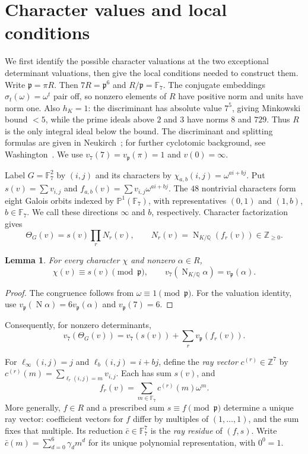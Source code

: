 \documentclass[11pt]{amsart}
\theoremstyle{plain}
\newtheorem{lemma}[theorem]{Lemma}
\theoremstyle{definition}
\numberwithin{equation}{section}
\DeclareMathOperator{\Nm}{N}
\newcommand{\Z}{\mathbb Z}
\newcommand{\Q}{\mathbb Q}
\newcommand{\F}{\mathbb F}
\newcommand{\GG}{G}
\newcommand{\pp}{\mathfrak p}
\begin{document}
\section{Character values and local conditions}\label{sec:prelim}

We first identify the possible character valuations at the two
exceptional determinant valuations, then give the local conditions
needed to construct them.
Write $\pp=\pi R$. Then $7R=\pp^6$ and $R/\pp=\F_7$.
The conjugate embeddings $\sigma_t(\omega)=\omega^t$ pair off, so
nonzero elements of $R$ have positive norm and units have norm one.
Also $h_K=1$: the discriminant has absolute value $7^5$, giving
Minkowski bound $<5$, while the prime ideals above $2$ and $3$ have
norms $8$ and $729$. Thus $R$ is the only integral ideal below the
bound. The discriminant and splitting formulas are given in
Neukirch~\cite[pp.~59--61]{Neukirch1999}; for further cyclotomic
background, see Washington~\cite[Chapter~2, pp.~9--19]{Washington1997}.
We use $v_7(7)=v_\pp(\pi)=1$ and $v(0)=\infty$.

Label $\GG=\F_7^2$ by $(i,j)$ and its characters by
$\chi_{a,b}(i,j)=\omega^{ai+bj}$. Put $s(v)=\sum v_{i,j}$ and
$f_{a,b}(v)=\sum v_{i,j}\omega^{ai+bj}$. The $48$ nontrivial
characters form eight Galois orbits indexed by $\mathbb P^1(\F_7)$,
with representatives $(0,1)$ and $(1,b)$, $b\in\F_7$. We call these
directions $\infty$ and $b$, respectively. Character factorization gives
\begin{equation}\label{eq:factorization}
 \Theta_\GG(v)=s(v)\prod_rN_r(v),\qquad
 N_r(v)=\Nm_{K/\Q}(f_r(v))\in\Z_{\ge0}.
\end{equation}

\begin{lemma}\label{lem:chi-mod-p}\label{lem:val-norm}
For every character $\chi$ and nonzero $\alpha\in R$,
\[
 \chi(v)\equiv s(v)\pmod\pp,\qquad
 v_7(\Nm_{K/\Q}\alpha)=v_\pp(\alpha).
\]
\end{lemma}
\begin{proof}
The congruence follows from $\omega\equiv1\pmod\pp$.
For the valuation identity, use
$v_\pp(\Nm\alpha)=6v_\pp(\alpha)$ and $v_\pp(7)=6$.
\end{proof}
Consequently, for nonzero determinants,
\begin{equation}\label{eq:v7-formula}
 v_7(\Theta_\GG(v))=v_7(s(v))+\sum_rv_\pp(f_r(v)).
\end{equation}

For $\ell_\infty(i,j)=j$ and $\ell_b(i,j)=i+bj$, define the
\emph{ray vector} $c^{(r)}\in\Z^7$ by
$c^{(r)}(m)=\sum_{\ell_r(i,j)=m}v_{i,j}$. Each has sum $s(v)$, and
\begin{equation}\label{eq:ray}
 f_r(v)=\sum_{m\in\F_7}c^{(r)}(m)\omega^m.
\end{equation}
More generally, $f\in R$ and a prescribed sum $s\equiv f\pmod\pp$
determine a unique ray vector: coefficient vectors for $f$ differ
by multiples of $(1,\ldots,1)$, and the sum fixes that multiple.
Its reduction $\bar c\in\F_7^7$ is the \emph{ray residue} of $(f,s)$.
Write $\bar c(m)=\sum_{d=0}^6\gamma_dm^d$ for its unique polynomial
representation, with $0^0=1$.
\end{document}
